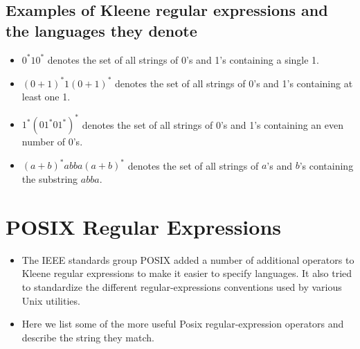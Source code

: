 \documentclass[]{article}
\begin{document}
  \subsection*{Examples of Kleene regular expressions and the languages they
  denote}
    \begin{itemize}
      \item $0^*10^*$ denotes the set of all strings of 0's and 1's containing a
            single 1.
      \item $(0 + 1)^*1(0 + 1)^*$ denotes the set of all strings of 0's and 1's
            containing at least one 1.
      \item $1^*(01^*01^*)^*$ denotes the set of all strings of 0's and 1's
            containing an even number of 0's.
      \item $(a + b)^*abba(a + b)^*$ denotes the set of all strings of $a$'s and
            $b$'s containing the substring $abba$.
    \end{itemize}

\section{POSIX Regular Expressions}
  \begin{itemize}
    \item The IEEE standards group POSIX added a number of additional operators
          to Kleene regular expressions to make it easier to specify languages.
          It also tried to standardize the different regular-expressions
          conventions used by various Unix utilities.
    \item Here we list some of the more useful Posix regular-expression
          operators and describe the string they match.
  \end{itemize}
\end{document}
